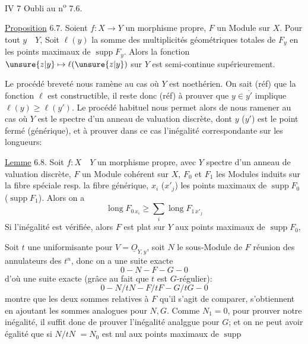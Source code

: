 IV 7 Oubli au n\textsuperscript{o} 7.6.

\uline{Proposition} 6.7. Soient $f:X\longrightarrow Y$ un morphisme
  propre,
$F$ un Module  
sur $X$.  Pour tout $y\quad Y$,
Soit $\ell(y)$ la somme des  multiplicités 
géométriques totales  de
$F_y$ en les points maximaux de $\operatorname{supp}F_y$.
Alors la fonction $\unsure{z|y}\mapsto\ell(\unsure{z|y})$ sur
$Y$ est semi-continue supérieurement.

Le procédé breveté nous ramène au cas où $Y$ est noethérien. On sait
(réf) que la fonction $\ell$ est constructible, il reste donc (réf) à prouver
que $y\in\overline{y'}$ implique $\ell(y)\geq\ell(y')$. Le procédé habituel nous permet
alors de nous ramener au cas où $Y$ est le spectre d'un anneau de valuation
discrète, dont $y$ ($y'$) est le point fermé (générique), et 
à prouver dans ce cas l'inégalité correspondante sur les longueurs:

\uline{Lemme} 6.8. Soit $f:X\quad Y$ un morphisme propre, avec $Y$ spectre d'un anneau
de valuation discrète, $F$ un Module cohérent sur $X$, 
$F_0$ et $F_1$ les 
Modules induits sur la fibre spéciale resp. la fibre générique, $x_i$
($x'_j$) les points maximaux de $\operatorname{supp}F_0$ ($\operatorname{supp}F_1$).
Alors on a
\[
\operatorname{long} F_{0\,x_i}\geq\sum_i\operatorname{long}F_{1\,x'_j}
\]
Si l'inégalité est vérifiée, alors $F$ est plat sur $Y$ aux points 
maximaux de $\operatorname{supp}F_0$, 

Soit $t$ une uniformisante pour $V=\underline O_{Y,y}$, soit $N$ le sous-Module
de $F$ réunion des annulateurs des $t^n$, donc on a une suite exacte
\[
0\mathrel{-}N\mathrel{-}F\mathrel{-}G\mathrel{-}0
\]
d'où une suite exacte (grâce au fait que $t$ est $G$-régulier):
\[
0\mathrel{-}N/tN\mathrel{-}F/tF\mathrel{-}G/tG\mathrel{-}0
\]
 montre que les deux sommes  relatives à $F$ qu'il s'agit de
comparer, s'obtiennent en ajoutant les sommes analogues pour $N,G$.
Comme $N_1=0$, pour prouver notre inégalité, il suffit donc de
prouver l'inégalité analggue pour $G$; et on ne peut avoir égalité
que si $N/tN$  $=N_0$ est nul aux points maximaux de $\operatorname{supp}$
\unsure{$\cdots$}

